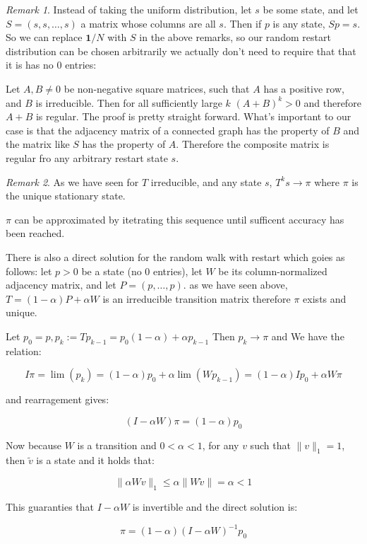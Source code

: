 \documentclass[a4paper,10pt]{article}
\newcommand{\gt}{>}
\newcommand{\lt}{<}
\theoremstyle{definition}
\theoremstyle{remark}
\newtheorem{remark}{Remark}
\theoremstyle{plain}
\begin{document}
\begin{remark}
Instead of taking the uniform distribution, let $s$ be some state, and let
$S = (s,s,\dots,s)$ a matrix whose columns are all $s$. Then if $p$ is any
state, $Sp = s$. So we can replace $\mathbf{1}/N$ with $S$ in the above
remarks, so our random restart distribution can be chosen arbitrarily we
actually don't need to require that that
it is has no $0$ entries:

Let $A,B \neq 0$ be non-negative square matrices, such that $A$ has a positive
row, and $B$ is irreducible. Then for all sufficiently large $k$  $(A+B)^k \gt
0$ and therefore $A+B$ is regular. The proof is pretty straight forward. What's
important to our case is that the adjacency matrix of a connected graph has the
property of $B$ and the matrix like $S$ has the property of $A$. Therefore the
composite matrix is regular fro any arbitrary restart state $s$.

\end{remark}


\begin{remark}
As we have seen for $T$ irreducible, and any state $s$, 
$T^ks \to \pi$ where $\pi$ is the unique stationary state.

$\pi$ can be approximated by itetrating this sequence until sufficent accuracy 
has been reached.

There is also a direct solution for the random walk with restart which goies as
follows: let $p > 0$ be a state (no $0$ entries), let $W$ be its
column-normalized adjacency matrix, and let $P = (p,\dots,p)$. as we have seen above,
$T = (1 - \alpha)P + \alpha W$ is an irreducible transition matrix
therefore $\pi$ exists and unique.

Let $p_0 = p, p_k := Tp_{k-1} = p_0(1-\alpha) + \alpha p_{k-1}$
Then $p_k \to \pi$ and 
We have the relation:

$$
I \pi = \lim(p_k) = (1 - \alpha)p_0 + \alpha \lim(W p_{k-1}) 
= (1-\alpha)I p_0 + \alpha W \pi
$$

and rearragement gives:

$$
(I - \alpha W)\pi = (1 - \alpha) p_0
$$

Now because $W$ is a transition and $0 < \alpha < 1$, for any $v$
such that $\|v\|_1 = 1$, then $\tilde{v}$ is a state and
it holds that:

$$
\|\alpha W v\|_1 \leq \alpha \|W \tilde{v}\| 
= \alpha \lt 1
$$

This guaranties that $I - \alpha W$ is invertible and
the direct solution is:


\[
\pi = (1 - \alpha) (I - \alpha W)^{-1} p_0
\]

\end{remark}
\end{document}
